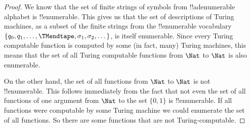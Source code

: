 \documentclass[../../../include/open-logic-section]{subfiles}
\begin{document}
\begin{proof}
We know that the set of finite strings of symbols from
!!a{denumerable} alphabet is !!{enumerable}. This gives us that the
set of descriptions of Turing machines, as a subset of the finite
strings from the !!{enumerable} vocabulary $\{q_0, q_1, \dots,
\TMendtape, \sigma_1, \sigma_2, \dots\}$, is itself enumerable.  Since
every Turing computable function is computed by some (in fact, many)
Turing machines, this means that the set of all Turing computable
functions from $\Nat$ to $\Nat$ is also enumerable.

On the other hand, the set of all functions from $\Nat$ to $\Nat$ is
not !!{enumerable}. This follows immediately from the fact that not
even the set of all functions of one argument from $\Nat$
to the set $\{0,1\}$ is !!{enumerable}.  If all functions
were computable by some Turing machine we could enumerate the set of
all functions. So there are some functions that are not
Turing-computable. 
\end{proof}
\end{document}
